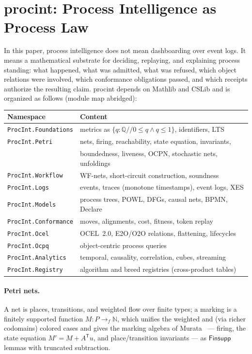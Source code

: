 \documentclass[11pt]{article}
\begin{document}
\section{procint: Process Intelligence as Process Law}
\label{sec:procint}

In this paper, process intelligence does not mean dashboarding over event
logs. It means a mathematical substrate for deciding, replaying, and
explaining process standing: what happened, what was admitted, what was
refused, which object relations were involved, which conformance
obligations passed, and which receipts authorize the resulting claim.
\textsf{procint} depends on Mathlib and CSLib and is organized as follows
(module map abridged):

\begin{center}
\small
\begin{tabular}{ll}
\toprule
Namespace & Content \\
\midrule
\texttt{ProcInt.Foundations} & metrics as \(\{q : \mathbb{Q} \mathrel{/\!/} 0 \le q \land q \le 1\}\), identifiers, LTS \\
\texttt{ProcInt.Petri} & nets, firing, reachability, state equation, invariants, \\
 & boundedness, liveness, OCPN, stochastic nets, unfoldings \\
\texttt{ProcInt.Workflow} & WF-nets, short-circuit construction, soundness \\
\texttt{ProcInt.Logs} & events, traces (monotone timestamps), event logs, XES \\
\texttt{ProcInt.Models} & process trees, POWL, DFGs, causal nets, BPMN, Declare \\
\texttt{ProcInt.Conformance} & moves, alignments, cost, fitness, token replay \\
\texttt{ProcInt.Ocel} & OCEL~2.0, E2O/O2O relations, flattening, lifecycles \\
\texttt{ProcInt.Ocpq} & object-centric process queries \\
\texttt{ProcInt.Analytics} & temporal, causality, correlation, cubes, streaming \\
\texttt{ProcInt.Registry} & algorithm and breed registries (cross-product tables) \\
\bottomrule
\end{tabular}
\end{center}

\paragraph{Petri nets.}
A net is places, transitions, and weighted flow over finite types; a marking
is a finitely supported function \(M : P \to_{f} \mathbb{N}\), which unifies
the weighted and (via richer codomains) colored cases and gives the marking
algebra of Murata~\cite{murata1989} --- firing, the state equation
\(M' = M + A^{\mathsf T} u\), and place/transition invariants --- as
\(\mathsf{Finsupp}\) lemmas with truncated subtraction.
\end{document}
